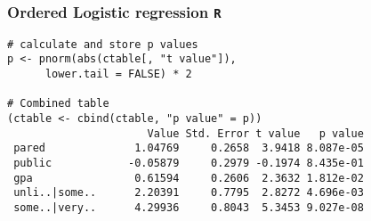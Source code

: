 \documentclass[00-GLMregslides.tex]{subfiles}
\begin{document}
\begin{frame}
\begin{frame}[fragile]
\begin{verbatim}
 

\end{verbatim}

\end{frame}
\begin{frame}[fragile]
	\frametitle{Ordered Logistic regression \texttt{R} }
\normalsize	
	\begin{verbatim}
# calculate and store p values
p <- pnorm(abs(ctable[, "t value"]), 
      lower.tail = FALSE) * 2

# Combined table
(ctable <- cbind(ctable, "p value" = p))
                      Value Std. Error t value   p value
 pared              1.04769     0.2658  3.9418 8.087e-05
 public            -0.05879     0.2979 -0.1974 8.435e-01
 gpa                0.61594     0.2606  2.3632 1.812e-02
 unli..|some..      2.20391     0.7795  2.8272 4.696e-03
 some..|very..      4.29936     0.8043  5.3453 9.027e-08
\end{verbatim}

\end{frame} 

\end{document}
